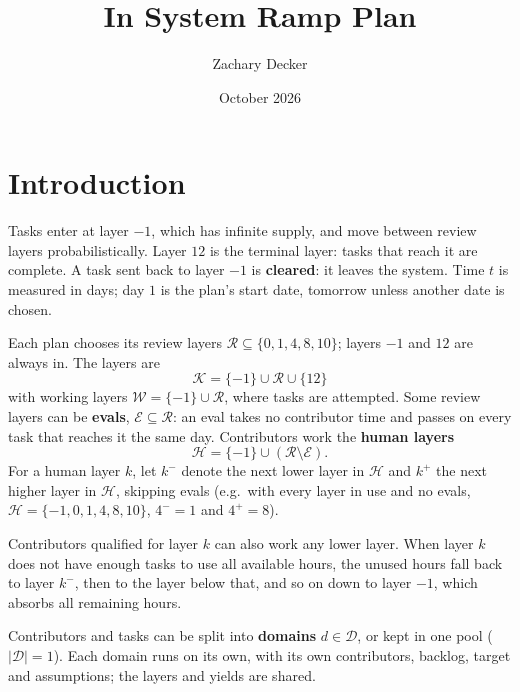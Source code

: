 \documentclass{article}
\title{In System Ramp Plan}
\author{Zachary Decker}
\date{October 2026}
\begin{document}
\maketitle

\section{Introduction}

Tasks enter at layer $-1$, which has infinite supply, and move between review layers probabilistically. Layer $12$ is the terminal layer: tasks that reach it are complete. A task sent back to layer $-1$ is \textbf{cleared}: it leaves the system. Time $t$ is measured in days; day $1$ is the plan's start date, tomorrow unless another date is chosen.

Each plan chooses its review layers $\mathcal{R} \subseteq \{0, 1, 4, 8, 10\}$; layers $-1$ and $12$ are always in. The layers are
\[
  \mathcal{K} = \{-1\} \cup \mathcal{R} \cup \{12\}
\]
with working layers $\mathcal{W} = \{-1\} \cup \mathcal{R}$, where tasks are attempted. Some review layers can be \textbf{evals}, $\mathcal{E} \subseteq \mathcal{R}$: an eval takes no contributor time and passes on every task that reaches it the same day. Contributors work the \textbf{human layers}
\[
  \mathcal{H} = \{-1\} \cup (\mathcal{R} \setminus \mathcal{E}).
\]
For a human layer $k$, let $k^-$ denote the next lower layer in $\mathcal{H}$ and $k^+$ the next higher layer in $\mathcal{H}$, skipping evals (e.g.\ with every layer in use and no evals, $\mathcal{H} = \{-1, 0, 1, 4, 8, 10\}$, $4^- = 1$ and $4^+ = 8$).

Contributors qualified for layer $k$ can also work any lower layer. When layer $k$ does not have enough tasks to use all available hours, the unused hours fall back to layer $k^-$, then to the layer below that, and so on down to layer $-1$, which absorbs all remaining hours.

Contributors and tasks can be split into \textbf{domains} $d \in \mathcal{D}$, or kept in one pool ($|\mathcal{D}| = 1$). Each domain runs on its own, with its own contributors, backlog, target and assumptions; the layers and yields are shared.
\end{document}
